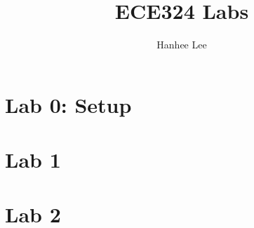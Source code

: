 \documentclass[twoside]{article}
\title{ECE324 Labs}
\author{Hanhee Lee}
\begin{document}
\maketitle

\tableofcontents

\begin{definition}
    
\end{definition}

\begin{process}

\end{process}

\begin{motivation}

\end{motivation}

\begin{derivation}

\end{derivation}

\begin{warning}

\end{warning}

\begin{summary}

\end{summary}

\begin{algo}

\end{algo}

\begin{example}
    
\end{example}

\begin{faq}

\end{faq}
\cleardoublepage

\section{Lab 0: Setup}

\cleardoublepage

\section{Lab 1}
\cleardoublepage

\section{Lab 2} 
\cleardoublepage
\end{document}
